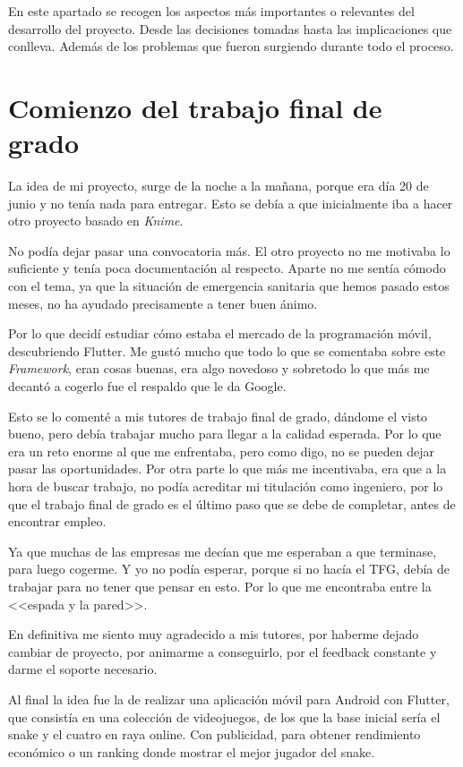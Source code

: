 
En este apartado se recogen los aspectos más importantes o relevantes del desarrollo del proyecto. Desde las decisiones tomadas hasta las implicaciones que conlleva. Además de los problemas que fueron surgiendo durante todo el proceso.

\section{Comienzo del trabajo final de grado}
La idea de mi proyecto, surge de la noche a la mañana, porque era día 20 de junio y no tenía nada para entregar. Esto se debía a que inicialmente iba a hacer otro proyecto basado en \emph{Knime}.

No podía dejar pasar una convocatoria más. El otro proyecto no me motivaba lo suficiente y tenía poca documentación al respecto. Aparte no me sentía cómodo con el tema, ya que la situación de emergencia sanitaria que hemos pasado estos meses, no ha ayudado precisamente a tener buen ánimo.

Por lo que decidí estudiar cómo estaba el mercado de la programación móvil, descubriendo Flutter. Me gustó mucho que todo lo que se comentaba sobre este \emph{Framework}, eran cosas buenas, era algo novedoso y sobretodo lo que más me decantó a cogerlo fue el respaldo que le da Google.

Esto se lo comenté a mis tutores de trabajo final de grado, dándome el visto bueno, pero debía trabajar mucho para llegar a la calidad esperada. Por lo que era un reto enorme al que me enfrentaba, pero como digo, no se pueden dejar pasar las oportunidades. Por otra parte lo que más me incentivaba, era que a la hora de buscar trabajo, no podía acreditar mi titulación como ingeniero, por lo que el trabajo final de grado es el último paso que se debe de completar, antes de encontrar empleo.

Ya que muchas de las empresas me decían que me esperaban a que terminase, para luego cogerme. Y yo no podía esperar, porque si no hacía el TFG, debía de trabajar para no tener que pensar en esto. Por lo que me encontraba entre la <<espada y la pared>>.

En definitiva me siento muy agradecido a mis tutores, por haberme dejado cambiar de proyecto, por animarme a conseguirlo, por el feedback constante y darme el soporte necesario.

Al final la idea fue la de realizar una aplicación móvil para Android con Flutter, que consistía en una colección de videojuegos, de los que la base inicial sería el snake y el cuatro en raya online. Con publicidad, para obtener rendimiento económico o un ranking donde mostrar el mejor jugador del snake.

